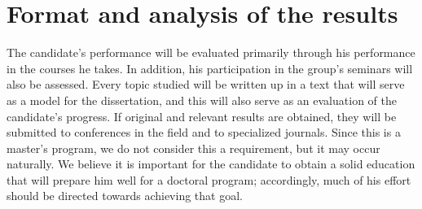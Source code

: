 \documentclass[12pt]{article}
\begin{document}
\section{Format and analysis of the results}
The candidate’s performance will be evaluated primarily through his performance in the courses he takes. In addition, his participation in the group's seminars will also be assessed. 
Every topic studied will be written up in a text that will serve as a model for the dissertation, and this will also serve as an evaluation of the candidate's progress. 
If original and relevant results are obtained, they will be submitted to conferences in the field and to specialized journals. 
Since this is a master’s program, we do not consider this a requirement, but it may occur naturally. 
We believe it is important for the candidate to obtain a solid education that will prepare him well for a doctoral program; accordingly, much of his effort should be directed towards achieving that goal.






\end{document}
